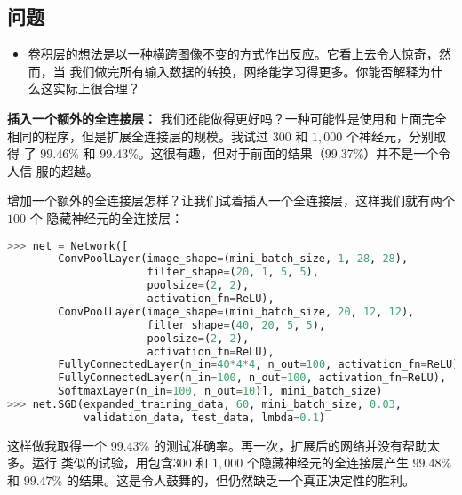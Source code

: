 \subsection*{问题}

\begin{itemize}
\item 卷积层的想法是以一种横跨图像不变的方式作出反应。它看上去令人惊奇，然而，当
  我们做完所有输入数据的转换，网络能学习得更多。你能否解释为什么这实际上很合理？
\end{itemize}

\textbf{插入一个额外的全连接层：} 我们还能做得更好吗？一种可能性是使用和上面完全
相同的程序，但是扩展全连接层的规模。我试过 $300$ 和 $1,000$ 个神经元，分别取得
了 $99.46$\% 和 $99.43$\%。这很有趣，但对于前面的结果（99.37\%）并不是一个令人信
服的超越。

增加一个额外的全连接层怎样？让我们试着插入一个全连接层，这样我们就有两个 $100$ 个
隐藏神经元的全连接层：
\begin{lstlisting}[language=Python]
>>> net = Network([
        ConvPoolLayer(image_shape=(mini_batch_size, 1, 28, 28), 
                      filter_shape=(20, 1, 5, 5), 
                      poolsize=(2, 2), 
                      activation_fn=ReLU),
        ConvPoolLayer(image_shape=(mini_batch_size, 20, 12, 12), 
                      filter_shape=(40, 20, 5, 5), 
                      poolsize=(2, 2), 
                      activation_fn=ReLU),
        FullyConnectedLayer(n_in=40*4*4, n_out=100, activation_fn=ReLU),
        FullyConnectedLayer(n_in=100, n_out=100, activation_fn=ReLU),
        SoftmaxLayer(n_in=100, n_out=10)], mini_batch_size)
>>> net.SGD(expanded_training_data, 60, mini_batch_size, 0.03, 
            validation_data, test_data, lmbda=0.1)
\end{lstlisting}

这样做我取得一个 99.43\% 的测试准确率。再一次，扩展后的网络并没有帮助太多。运行
类似的试验，用包含$300$ 和 $1,000$ 个隐藏神经元的全连接层产生 $99.48$\% 和
$99.47$\% 的结果。这是令人鼓舞的，但仍然缺乏一个真正决定性的胜利。

